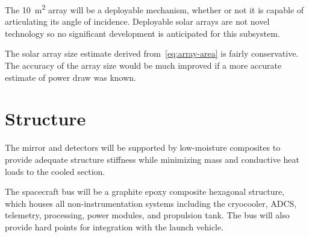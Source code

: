 \documentclass{ws-jai}
\begin{document}
The \SI{10}{\meter\squared} array will be a deployable mechanism, whether or not it is capable of articulating its angle of incidence.
Deployable solar arrays are not novel technology so no significant development is anticipated for this subsystem.


The solar array size estimate derived from~\autoref{eq:array-area} is fairly conservative.
The accuracy of the array size would be much improved if a more accurate estimate of power draw was known.

\section{Structure}
\label{sec:structure}
The mirror and detectors will be supported by low-moisture composites to provide adequate structure stiffness while minimizing mass and conductive heat loads to the cooled section.

The spacecraft bus will be a graphite epoxy composite hexagonal structure, which houses all non-instrumentation systems including the cryocooler, ADCS, telemetry, processing, power modules, and propulsion tank.
The bus will also provide hard points for integration with the launch vehicle.



\end{document}
